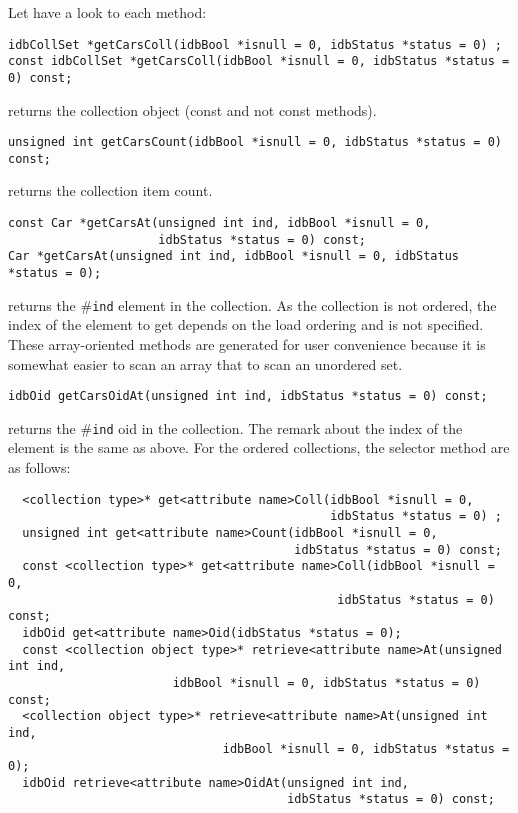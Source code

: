\normalsize
Let have a look to each method:
\be
\item
\verbsize
\begin{verbatim}
idbCollSet *getCarsColl(idbBool *isnull = 0, idbStatus *status = 0) ;
const idbCollSet *getCarsColl(idbBool *isnull = 0, idbStatus *status = 0) const;
\end{verbatim}
\normalsize
returns the collection object (const and not const methods).
\item
\verbsize
\begin{verbatim}
unsigned int getCarsCount(idbBool *isnull = 0, idbStatus *status = 0) const;
\end{verbatim}
\normalsize
returns the collection item count.
\verbsize
\item
\verbsize
\begin{verbatim}
const Car *getCarsAt(unsigned int ind, idbBool *isnull = 0,
                     idbStatus *status = 0) const;
Car *getCarsAt(unsigned int ind, idbBool *isnull = 0, idbStatus *status = 0);
\end{verbatim}
\normalsize
returns the \#\texttt{ind} element in the collection. As the collection
is not ordered, the index of the element to get depends on the
load ordering and is not specified. These array-oriented methods
are generated for user convenience because it is somewhat easier to
scan an array that to scan an unordered set.
\item
\verbsize
\begin{verbatim}
idbOid getCarsOidAt(unsigned int ind, idbStatus *status = 0) const;
\end{verbatim}
\normalsize
returns the \#\texttt{ind} oid in the collection.
The remark about the index of the element is the same as above.
\ee
For the ordered collections, the selector method are as follows:
\verbsize
\begin{verbatim}
  <collection type>* get<attribute name>Coll(idbBool *isnull = 0,
                                             idbStatus *status = 0) ;
  unsigned int get<attribute name>Count(idbBool *isnull = 0,
                                        idbStatus *status = 0) const;
  const <collection type>* get<attribute name>Coll(idbBool *isnull = 0,
                                              idbStatus *status = 0) const;
  idbOid get<attribute name>Oid(idbStatus *status = 0);
  const <collection object type>* retrieve<attribute name>At(unsigned int ind,
                       idbBool *isnull = 0, idbStatus *status = 0) const;
  <collection object type>* retrieve<attribute name>At(unsigned int ind,
                              idbBool *isnull = 0, idbStatus *status = 0);
  idbOid retrieve<attribute name>OidAt(unsigned int ind,
                                       idbStatus *status = 0) const;
\end{verbatim}
